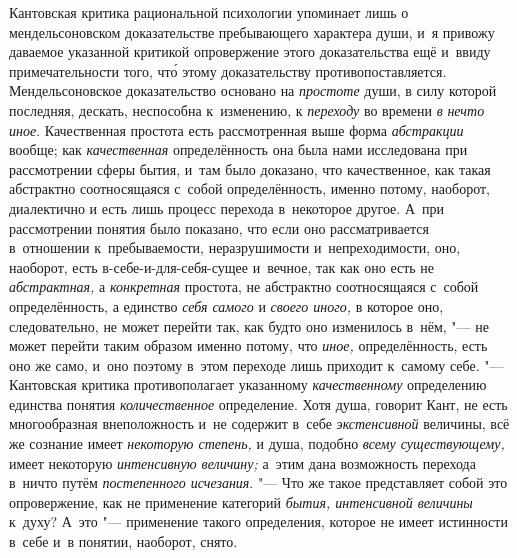 Кантовская критика рациональной психологии упоминает лишь о
мендельсоновском доказательстве пребывающего характера души, и~я привожу
даваемое указанной критикой опровержение этого доказательства ещё и~ввиду
примечательности того, чт\'{о} этому доказательству
противопоставляется.
Мендельсоновское доказательство основано на {\em простоте} души, в
силу которой последняя, дескать, неспособна к~изменению, к
{\em переходу} во времени {\em в} {\em нечто иное}.
Качественная простота есть рассмотренная выше форма
{\em абстракции} вообще; как {\em качественная}
определённость она была нами исследована при рассмотрении
сферы бытия, и~там было доказано, что качественное, как такая абстрактно
соотносящаяся с~собой определённость, именно потому, наоборот, диалектично
и есть лишь процесс перехода в~некоторое другое. А~при рассмотрении понятия
было показано, что если оно рассматривается в~отношении к~пребываемости,
неразрушимости и~непреходимости, оно, наоборот, есть
в-себе-и-для-себя-сущее и~вечное, так как оно есть не
{\em абстрактная,} а {\em конкретная}
простота, не абстрактно соотносящаяся с~собой определённость,
а единство {\em себя самого} и {\em своего иного,}
в которое оно, следовательно, не может перейти так,
как будто оно изменилось в~нём, "--- не может перейти таким
образом именно потому, что {\em иное,}
определённость, есть оно же само, и~оно поэтому в~этом
переходе лишь приходит к~самому себе. "--- Кантовская критика
противополагает указанному {\em качественному}
определению единства понятия {\em количественное}
определение. Хотя душа, говорит Кант, не есть многообразная
внеположность и~не содержит в~себе {\em экстенсивной}
величины, всё же сознание имеет {\em некоторую степень,}
и душа, подобно {\em всему существующему,} имеет некоторую
{\em интенсивную величину;} а~этим дана возможность перехода в~ничто путём
{\em постепенного исчезания}. "---
Что же такое представляет собой это опровержение, как не
применение категорий {\em бытия, интенсивной величины} к~духу? А~это
"--- применение такого определения, которое не имеет истинности
в~себе и~в понятии, наоборот, снято.


